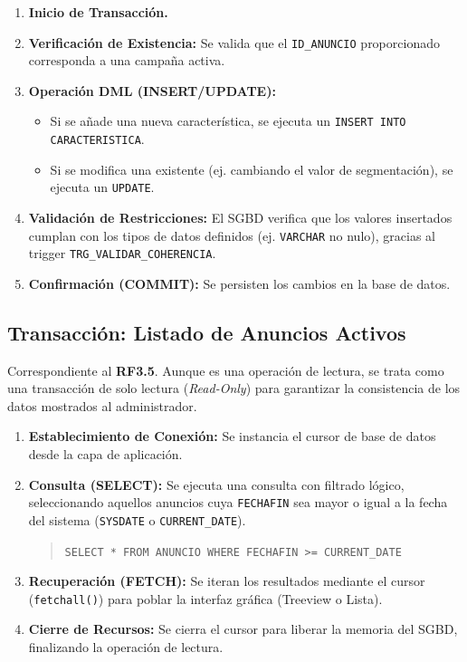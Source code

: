 \begin{enumerate}
    \item \textbf{Inicio de Transacción.}
    \item \textbf{Verificación de Existencia:} Se valida que el \texttt{ID\_ANUNCIO} proporcionado corresponda a una campaña activa.
    \item \textbf{Operación DML (INSERT/UPDATE):} 
    \begin{itemize}
        \item Si se añade una nueva característica, se ejecuta un \texttt{INSERT INTO CARACTERISTICA}.
        \item Si se modifica una existente (ej. cambiando el valor de segmentación), se ejecuta un \texttt{UPDATE}.
    \end{itemize}
    \item \textbf{Validación de Restricciones:} El SGBD verifica que los valores insertados cumplan con los tipos de datos definidos (ej. \texttt{VARCHAR} no nulo), gracias al trigger \texttt{TRG\_VALIDAR\_COHERENCIA}.
    \item \textbf{Confirmación (COMMIT):} Se persisten los cambios en la base de datos.
\end{enumerate}

\subsection{Transacción: Listado de Anuncios Activos}
Correspondiente al \textbf{RF3.5}. Aunque es una operación de lectura, se trata como una transacción de solo lectura (\textit{Read-Only}) para garantizar la consistencia de los datos mostrados al administrador.

\begin{enumerate}
    \item \textbf{Establecimiento de Conexión:} Se instancia el cursor de base de datos desde la capa de aplicación.
    \item \textbf{Consulta (SELECT):} Se ejecuta una consulta con filtrado lógico, seleccionando aquellos anuncios cuya \texttt{FECHAFIN} sea mayor o igual a la fecha del sistema (\texttt{SYSDATE} o \texttt{CURRENT\_DATE}).
    \begin{quote}
        \texttt{SELECT * FROM ANUNCIO WHERE FECHAFIN >= CURRENT\_DATE}
    \end{quote}
    \item \textbf{Recuperación (FETCH):} Se iteran los resultados mediante el cursor (\texttt{fetchall()}) para poblar la interfaz gráfica (Treeview o Lista).
    \item \textbf{Cierre de Recursos:} Se cierra el cursor para liberar la memoria del SGBD, finalizando la operación de lectura.
\end{enumerate}